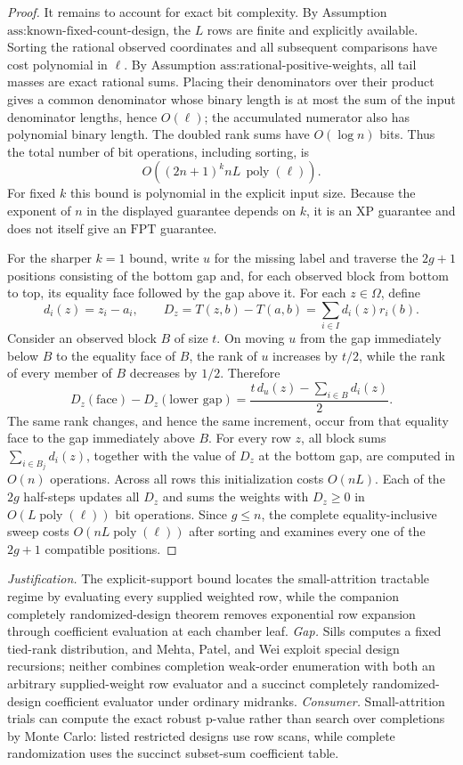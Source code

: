 \documentclass{article}
\begin{document}
\begin{proof}
It remains to account for exact bit complexity.  By
Assumption \(\text{ass:known-fixed-count-design}\), the \(L\) rows are finite
and explicitly available.  Sorting the rational observed coordinates and all
subsequent comparisons have cost polynomial in \(\ell\).  By
Assumption \(\text{ass:rational-positive-weights}\), all tail masses are exact
rational sums.  Placing their denominators over their product gives a common
denominator whose binary length is at most the sum of the input denominator
lengths, hence \(O(\ell)\); the accumulated numerator also has polynomial
binary length.  The doubled rank sums have \(O(\log n)\) bits.  Thus the total
number of bit operations, including sorting, is
\[
 O\!\left((2n+1)^k nL\,\operatorname{poly}(\ell)\right).
\]
For fixed \(k\) this bound is polynomial in the explicit input size.  Because
the exponent of \(n\) in the displayed guarantee depends on \(k\), it is an
\(\mathrm{XP}\) guarantee and does not itself give an \(\mathrm{FPT}\)
guarantee.

For the sharper \(k=1\) bound, write \(u\) for the missing label and traverse
the \(2g+1\) positions consisting of the bottom gap and, for each observed
block from bottom to top, its equality face followed by the gap above it.  For
each \(z\in\Omega\), define
\[
 d_i(z)=z_i-a_i,
 \qquad D_z= T(z,b)-T(a,b)=\sum_{i\in I}d_i(z)r_i(b).
\]
Consider an observed block \(B\) of size \(t\).  On moving \(u\) from the gap
immediately below \(B\) to the equality face of \(B\), the rank of \(u\)
increases by \(t/2\), while the rank of every member of \(B\) decreases by
\(1/2\).  Therefore
\[
 D_z(\text{face})-D_z(\text{lower gap})
 =\frac{t\,d_u(z)-\sum_{i\in B}d_i(z)}{2}.
\]
The same rank changes, and hence the same increment, occur from that equality
face to the gap immediately above \(B\).  For every row \(z\), all block sums
\(\sum_{i\in B_j}d_i(z)\), together with the value of \(D_z\) at the bottom
gap, are computed in \(O(n)\) operations.  Across all rows this initialization
costs \(O(nL)\).  Each of the \(2g\) half-steps updates all \(D_z\) and sums
the weights with \(D_z\ge0\) in \(O(L\operatorname{poly}(\ell))\) bit
operations.  Since \(g\le n\), the complete equality-inclusive sweep costs
\(O(nL\operatorname{poly}(\ell))\) after sorting and examines every one of the
\(2g+1\) compatible positions.
\end{proof}
\par\smallskip\noindent \textit{Justification.} The explicit-support bound locates the small-attrition tractable regime by evaluating every supplied weighted row, while the companion completely randomized-design theorem removes exponential row expansion through coefficient evaluation at each chamber leaf. \textit{Gap.} Sills computes a fixed tied-rank distribution, and Mehta, Patel, and Wei exploit special design recursions; neither combines completion weak-order enumeration with both an arbitrary supplied-weight row evaluator and a succinct completely randomized-design coefficient evaluator under ordinary midranks. \textit{Consumer.} Small-attrition trials can compute the exact robust p-value rather than search over completions by Monte Carlo: listed restricted designs use row scans, while complete randomization uses the succinct subset-sum coefficient table.
\end{document}
